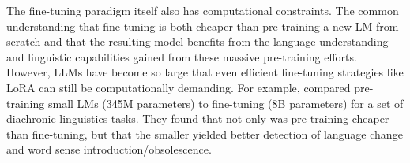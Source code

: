 The fine-tuning paradigm itself also has computational constraints. The common understanding that fine-tuning is both cheaper than pre-training a new LM from scratch and that the resulting model benefits from the language understanding and linguistic capabilities gained from these massive pre-training efforts. However, LLMs have become so large that even efficient fine-tuning strategies like LoRA \citep{hu2022lora} can still be computationally demanding. For example, \citet{fittschen2025pretraininglanguagemodelsdiachronic} compared pre-training small LMs (345M parameters) to fine-tuning  (8B parameters) for a set of diachronic linguistics tasks. They found that not only was pre-training cheaper than fine-tuning, but that the smaller yielded better detection of language change and word sense introduction/obsolescence. 

